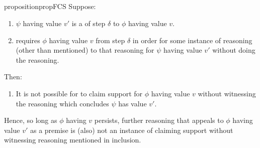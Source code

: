 \subsection{\FCS{}}
\label{sec:fcs-2}

\begin{note}
  \begin{restatable}{proposition}{propFCS}
    \label{prop:fcs}
    Suppose:

    \begin{enumerate}
    \item
      \(\psi\) having value \(v'\) is a \crequ{} of step \(\delta\) to \(\phi\) having value \(v\).
    \item
      \vAgent{} requires \(\phi\) having value \(v\) from step \(\delta\)
      in order for some instance of reasoning (other than mentioned) to \indicateN{} that reasoning for \(\psi\) having value \(v'\) without doing the reasoning.
    \end{enumerate}

    Then:
    \begin{enumerate}[resume]
    \item
      It is not possible for \vAgent{} to claim support for \(\phi\) having value \(v\) without witnessing the reasoning which concludes \(\psi\) has value \(v'\).
    \end{enumerate}
    \vspace{-\baselineskip}
  \end{restatable}

  Hence, so long as \(\phi\) having \(v\) persists, further reasoning that appeals to \(\phi\) having value \(v'\) as a premise is (also) not an instance of claiming support without witnessing reasoning mentioned in {\color{red} inclusion}.
\end{note}




